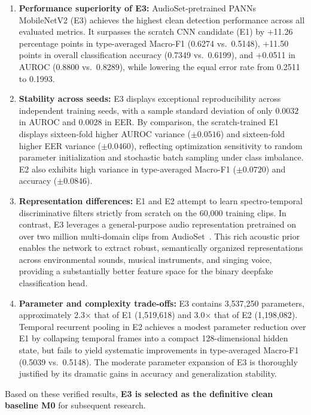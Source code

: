 \documentclass[12pt,a4paper]{report}
\begin{document}
\begin{enumerate}[label=\textbf{\arabic*.},leftmargin=*,itemsep=0.3em]
  \item \textbf{Performance superiority of E3:} AudioSet-pretrained PANNs MobileNetV2 (E3) achieves the highest clean detection performance across all evaluated metrics. It surpasses the scratch CNN candidate (E1) by +11.26 percentage points in type-averaged Macro-F1 (0.6274 vs.\ 0.5148), +11.50 points in overall classification accuracy (0.7349 vs.\ 0.6199), and +0.0511 in AUROC (0.8800 vs.\ 0.8289), while lowering the equal error rate from 0.2511 to 0.1993.
  \item \textbf{Stability across seeds:} E3 displays exceptional reproducibility across independent training seeds, with a sample standard deviation of only $0.0032$ in AUROC and $0.0028$ in EER. By comparison, the scratch-trained E1 displays sixteen-fold higher AUROC variance ($\pm 0.0516$) and sixteen-fold higher EER variance ($\pm 0.0460$), reflecting optimization sensitivity to random parameter initialization and stochastic batch sampling under class imbalance. E2 also exhibits high variance in type-averaged Macro-F1 ($\pm 0.0720$) and accuracy ($\pm 0.0846$).
  \item \textbf{Representation differences:} E1 and E2 attempt to learn spectro-temporal discriminative filters strictly from scratch on the 60{,}000 training clips. In contrast, E3 leverages a general-purpose audio representation pretrained on over two million multi-domain clips from AudioSet~\cite{kong2020panns}. This rich acoustic prior enables the network to extract robust, semantically organized representations across environmental sounds, musical instruments, and singing voice, providing a substantially better feature space for the binary deepfake classification head.
  \item \textbf{Parameter and complexity trade-offs:} E3 contains 3{,}537{,}250 parameters, approximately 2.3$\times$ that of E1 (1{,}519{,}618) and 3.0$\times$ that of E2 (1{,}198{,}082). Temporal recurrent pooling in E2 achieves a modest parameter reduction over E1 by collapsing temporal frames into a compact 128-dimensional hidden state, but fails to yield systematic improvements in type-averaged Macro-F1 (0.5039 vs.\ 0.5148). The moderate parameter expansion of E3 is thoroughly justified by its dramatic gains in accuracy and generalization stability.
\end{enumerate}

Based on these verified results, \textbf{E3 is selected as the definitive clean baseline M0} for subsequent research.
\end{document}
